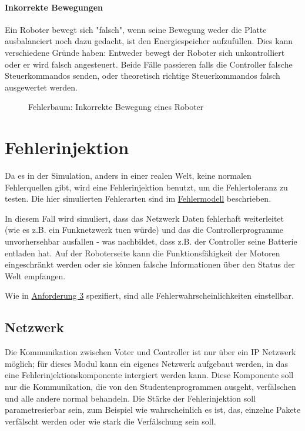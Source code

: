 \paragraph{Inkorrekte Bewegungen} Ein Roboter bewegt sich "falsch", wenn seine Bewegung weder die Platte 
ausbalanciert noch dazu gedacht, ist den Energiespeicher aufzuf{\"{u}}llen. Dies kann verschiedene Gr{\"{u}}nde 
haben: Entweder bewegt der Roboter sich unkontrolliert oder er wird falsch angesteuert. Beide F{\"{a}}lle
passieren falls die Controller falsche Steuerkommandos senden, oder theoretisch richtige Steuerkommandos
falsch ausgewertet werden.
\begin{figure}
	\centering
	\caption{Fehlerbaum: Inkorrekte Bewegung eines Roboter}
	\label{fig:fault-tree-robot2}
\end{figure}
\clearpage

\clearpage
\section{Fehlerinjektion}
Da es in der Simulation, anders in einer realen Welt, keine normalen Fehlerquellen gibt, wird eine
Fehlerinjektion benutzt, um die Fehlertoleranz zu testen. Die hier simulierten Fehlerarten 
sind im \hyperref[fm]{Fehlermodell} beschrieben.

In diesem Fall wird simuliert, dass das Netzwerk Daten fehlerhaft weiterleitet
(wie es z.B. ein Funknetzwerk tuen w{\"{u}}rde) und das die Controllerprogramme unvorhersehbar
ausfallen - was nachbildet, dass z.B. der Controller seine Batterie entladen hat. Auf der Roboterseite
kann die Funktionsf{\"{a}}higkeit der Motoren eingeschr{\"{a}}nkt werden oder sie k{\"{o}}nnen
falsche Informationen {\"{u}}ber den Status der Welt empfangen.

Wie in \hyperref[anforderung]{Anforderung 3} spezifiert, sind alle Fehlerwahrscheinlichkeiten einstellbar.

\subsection{Netzwerk}
Die Kommunikation zwischen Voter und Controller ist nur {\"{u}}ber ein IP Netzwerk m{\"{o}}glich;
f{\"{u}}r dieses Modul kann ein eigenes Netzwerk aufgebaut werden, in das eine Fehlerinjektionskomponente 
intergiert werden kann. Diese Komponente soll nur die Kommunikation, die von den Studentenprogrammen ausgeht, 
verf{\"{a}}lschen und alle andere normal behandeln. Die St{\"{a}}rke der Fehlerinjektion soll parametresierbar 
sein, zum Beispiel wie wahrscheinlich es ist, das, einzelne Pakete verf{\"{a}}lscht werden oder wie stark
die Verf{\"{a}}lschung sein soll.

